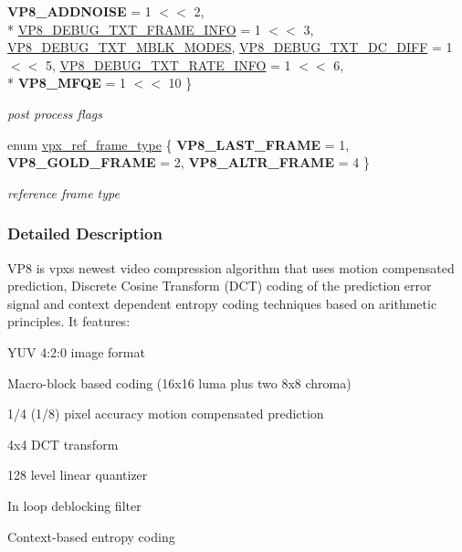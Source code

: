\begin{DoxyCompactItemize}
{\bfseries V\+P8\+\_\+\+A\+D\+D\+N\+O\+I\+SE} = 1 $<$$<$ 2, 
\\*
\hyperlink{group__vp8_gga99557e20eb37826e6792cd8819121770ab52568f51e409f219744e06b446102bb}{V\+P8\+\_\+\+D\+E\+B\+U\+G\+\_\+\+T\+X\+T\+\_\+\+F\+R\+A\+M\+E\+\_\+\+I\+N\+FO} = 1 $<$$<$ 3, 
\hyperlink{group__vp8_gga99557e20eb37826e6792cd8819121770a9e3fd9032d2556918d0f6d0d1ef46d14}{V\+P8\+\_\+\+D\+E\+B\+U\+G\+\_\+\+T\+X\+T\+\_\+\+M\+B\+L\+K\+\_\+\+M\+O\+D\+ES}, 
\hyperlink{group__vp8_gga99557e20eb37826e6792cd8819121770acc0405eaa19b1ed01fb40945cfce4d12}{V\+P8\+\_\+\+D\+E\+B\+U\+G\+\_\+\+T\+X\+T\+\_\+\+D\+C\+\_\+\+D\+I\+FF} = 1 $<$$<$ 5, 
\hyperlink{group__vp8_gga99557e20eb37826e6792cd8819121770aff0413e7978a7cf8915b8341373751b5}{V\+P8\+\_\+\+D\+E\+B\+U\+G\+\_\+\+T\+X\+T\+\_\+\+R\+A\+T\+E\+\_\+\+I\+N\+FO} = 1 $<$$<$ 6, 
\\*
{\bfseries V\+P8\+\_\+\+M\+F\+QE} = 1 $<$$<$ 10
 \}\begin{DoxyCompactList}\small\item\em post process flags \end{DoxyCompactList}
\item 
enum \hyperlink{group__vp8_gad8ab72d8a178a68339dad2987358c331}{vpx\+\_\+ref\+\_\+frame\+\_\+type} \{ {\bfseries V\+P8\+\_\+\+L\+A\+S\+T\+\_\+\+F\+R\+A\+ME} = 1, 
{\bfseries V\+P8\+\_\+\+G\+O\+L\+D\+\_\+\+F\+R\+A\+ME} = 2, 
{\bfseries V\+P8\+\_\+\+A\+L\+T\+R\+\_\+\+F\+R\+A\+ME} = 4
 \}\begin{DoxyCompactList}\small\item\em reference frame type \end{DoxyCompactList}
\end{DoxyCompactItemize}


\subsubsection{Detailed Description}
V\+P8 is vpx\textquotesingle{}s newest video compression algorithm that uses motion compensated prediction, Discrete Cosine Transform (D\+CT) coding of the prediction error signal and context dependent entropy coding techniques based on arithmetic principles. It features\+:
\begin{DoxyItemize}
\item Y\+UV 4\+:2\+:0 image format
\item Macro-\/block based coding (16x16 luma plus two 8x8 chroma)
\item 1/4 (1/8) pixel accuracy motion compensated prediction
\item 4x4 D\+CT transform
\item 128 level linear quantizer
\item In loop deblocking filter
\item Context-\/based entropy coding 
\end{DoxyItemize}

